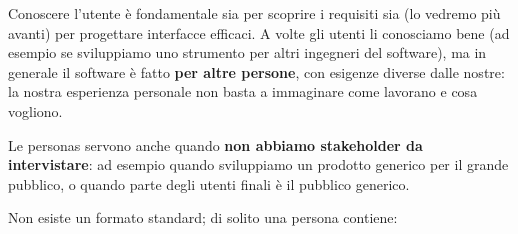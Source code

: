Conoscere l'utente è fondamentale sia per scoprire i requisiti sia (lo vedremo più avanti) per progettare interfacce efficaci.
A volte gli utenti li conosciamo bene (ad esempio se sviluppiamo uno strumento per altri ingegneri del software), ma in generale
il software è fatto \textbf{per altre persone}, con esigenze diverse dalle nostre: la nostra esperienza personale non basta
a immaginare come lavorano e cosa vogliono.

Le personas servono anche quando \textbf{non abbiamo stakeholder da intervistare}: ad esempio quando sviluppiamo un prodotto
generico per il grande pubblico, o quando parte degli utenti finali è il pubblico generico.

Non esiste un formato standard; di solito una persona contiene:

\begin{center}
\end{center}

